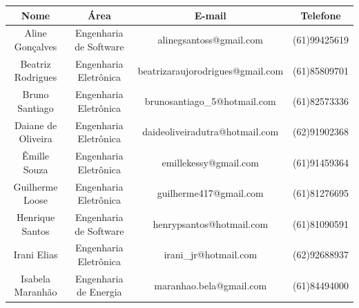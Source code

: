 \begin{table}[H]
\center
\footnotesize
\begin{tabular}{|l|l|l|l|}
\hline
\multicolumn{1}{|c}{\textbf{Nome}}  & \multicolumn{1}{|c}{\textbf{Área}}     & \multicolumn{1}{|c|}{\textbf{E-mail}} &  \multicolumn{1}{|c|}{\textbf{Telefone}}  \\ \hline
\multicolumn{1}{|c}{Aline Gonçalves}       & \multicolumn{1}{|c}{Engenharia de Software} & \multicolumn{1}{|c|}{alinegsantoss@gmail.com}               &  \multicolumn{1}{|c|}{(61)99425619}           \\ \hline
\multicolumn{1}{|c}{Beatriz Rodrigues} & \multicolumn{1}{|c}{Engenharia Eletrônica}    & \multicolumn{1}{|c|}{beatrizaraujorodrigues@gmail.com}               &\multicolumn{1}{|c|}{(61)85809701}          \\ \hline
\multicolumn{1}{|c}{Bruno Santiago}       & \multicolumn{1}{|c}{Engenharia Eletrônica}    & \multicolumn{1}{|c|}{brunosantiago\_5@hotmail.com}     & \multicolumn{1}{|c|}{(61)82573336}         \\ \hline
\multicolumn{1}{|c}{Daiane de Oliveira}   & \multicolumn{1}{|c}{Engenharia Eletrônica}                  & \multicolumn{1}{|c|}{daideoliveiradutra@hotmail.com}                & \multicolumn{1}{|c|}{(62)91902368}          \\ \hline
\multicolumn{1}{|c}{Êmille Souza} & \multicolumn{1}{|c}{Engenharia Eletrônica}     & \multicolumn{1}{|c|}{emillekessy@gmail.com}        &   \multicolumn{1}{|c|}{(61)91459364}        \\ \hline
\multicolumn{1}{|c}{Guilherme Loose}     & \multicolumn{1}{|c}{Engenharia Eletrônica}                  & \multicolumn{1}{|c|}{guilherme417@gmail.com}                & \multicolumn{1}{|c|}{(61)81276695}         \\ \hline
\multicolumn{1}{|c}{Henrique Santos}      &        \multicolumn{1}{|c}{Engenharia de Software}     &        \multicolumn{1}{|c|}{henrypsantos@hotmail.com}        & \multicolumn{1}{|c|}{(61)81090591}    \\ \hline
\multicolumn{1}{|c}{Irani Elias}                 &      \multicolumn{1}{|c}{Engenharia Eletrônica}      &            \multicolumn{1}{|c|}{irani\_jr@hotmail.com}      & \multicolumn{1}{|c|}{(62)92688937}          \\ \hline
\multicolumn{1}{|c}{Isabela Maranhão}       &   \multicolumn{1}{|c}{Engenharia de Energia}           &       \multicolumn{1}{|c|}{maranhao.bela@gmail.com}                                   & \multicolumn{1}{|c|}{(61)84494000}         \\ \hline

\end{tabular}
\end{table}
